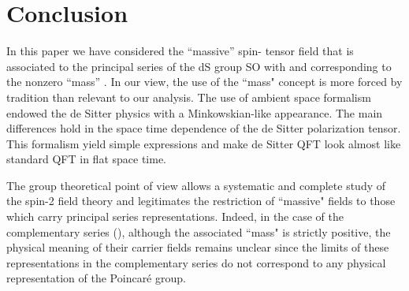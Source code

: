 \documentclass[a4paper,11pt,showpacs,preprintnumbers]{revtex4}
\begin{document}
\section{Conclusion}

In this paper we have considered the ``massive'' spin-\coordHE{} tensor
field that is associated to the principal series of the dS group
SO\coordHE{} with \coordHE{}
and corresponding to the nonzero ``mass''
\coordHE{}. In our view, the use of the
``mass" concept is more forced by tradition than relevant to our
analysis. The use of ambient space formalism endowed the de Sitter
physics with a Minkowskian-like appearance. The main differences
hold in  the space time dependence of the de Sitter polarization
tensor. This formalism yield simple expressions and make de Sitter
QFT look almost like standard QFT in flat space time.

The group theoretical point of view allows a systematic and
complete study of the spin-2 field theory and legitimates the
restriction of ``massive" fields to those which carry principal
series representations. Indeed, in the case of the complementary
series (\coordHE{}), although the
associated ``mass" \coordHE{} is
strictly positive, the physical meaning of their carrier fields
remains unclear since the \coordHE{} limits of these representations in
the complementary series do not correspond to any physical
representation of the Poincar\'e group.
\end{document}
